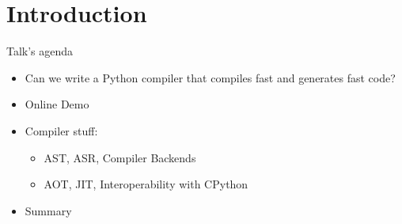\section{Introduction}

 
 \begin{frame}{Talk's agenda}
    \begin{itemize}
        \item Can we write a Python compiler that compiles fast and generates fast code?
        \item Online Demo
        \item Compiler stuff: 
        \begin{itemize}
            \item AST, ASR, Compiler Backends
            \item AOT, JIT, Interoperability with CPython
        \end{itemize}
        \item Summary
    \end{itemize}   
\end{frame}